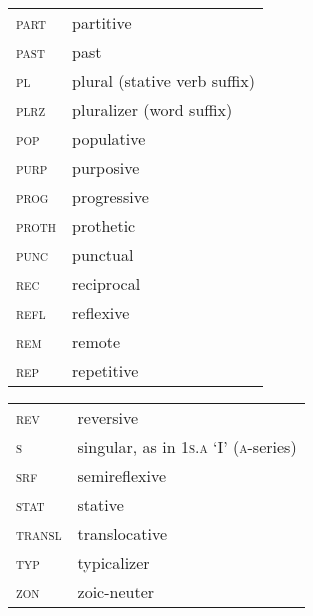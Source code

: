 \begin{tabularx}{\textwidth}{lQ}
\textsc{part}            &      partitive                             \\
\textsc{past}            &      past                                  \\
\textsc{pl}            &      plural (stative verb suffix)   \\
\textsc{plrz}            &      pluralizer (word suffix)   \\
\textsc{pop}             &      populative                            \\
\textsc{purp}	&	purposive \\
\textsc{prog}            &      progressive                           \\
\textsc{proth}           &      prothetic                             \\
\textsc{punc}            &      punctual                              \\
\textsc{rec}	&	reciprocal \\
\textsc{refl}            &      reflexive                             \\
\textsc{rem}             &      remote                                \\
\textsc{rep}             &      repetitive                            \\
\end{tabularx}

\begin{tabularx}{\textwidth}{lQ}
\textsc{rev}             &      reversive                             \\
\textsc{s}	&	singular, as in \textsc{1s.a} ‘I’ (\textsc{a}-series) \\
\textsc{srf}             &      semireflexive                         \\
\textsc{stat}            &      stative                               \\
\textsc{transl}          &      translocative                         \\
\textsc{typ} & typicalizer \\
\textsc{zon}	&	zoic-neuter \\
\end{tabularx}



